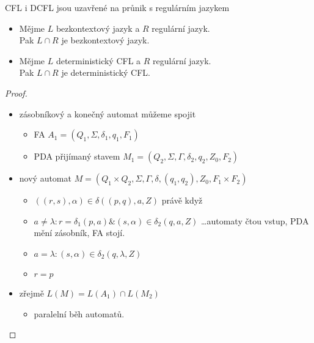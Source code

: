\documentclass[../main.tex]{subfiles}
\begin{document}
\begin{theorem}
    CFL i DCFL jsou uzavřené na průnik s regulárním jazykem\\
    \begin{itemize}
        \item Mějme $L$ bezkontextový jazyk a $R$ regulární jazyk.\\
            Pak $L\cap R$ je bezkontextový jazyk.
        \item Mějme $L$ deterministický CFL a $R$ regulární jazyk.\\
            Pak $L\cap R$ je deterministický CFL.
    \end{itemize}
    \begin{proof}
        \begin{itemize}
            \item zásobníkový a konečný automat můžeme spojit
            \begin{itemize}
                \item FA $A_1 = (Q_1,\Sigma,\delta_1,q_1,F_1)$
                \item PDA přijímaný stavem $M_1 = (Q_2,\Sigma,\Gamma,\delta_2,q_2,Z_0,F_2)$
            \end{itemize}
            \item nový automat $M = (Q_1 \times Q_2, \Sigma, \Gamma, \delta, (q_1,q_2), Z_0, F_1 \times F_2)$
            \begin{itemize}
                \item $((r,s),\alpha)\in \delta((p,q),a,Z)$ právě když 
                \item $ a\neq \lambda: r = \delta_1(p,a)\&(s,\alpha)\in \delta_2(q,a,Z)$ \dots automaty čtou vstup, PDA mění zásobník, FA stojí.
                \item $a = \lambda: (s,\alpha)\in \delta_2(q,\lambda,Z)$
                \item $r = p$
            \end{itemize}
            \item zřejmě $L(M) = L(A_1) \cap L(M_2)$
            \begin{itemize}
                \item paralelní běh automatů.
            \end{itemize}
        \end{itemize}
    \end{proof}
\end{theorem}
\end{document}
